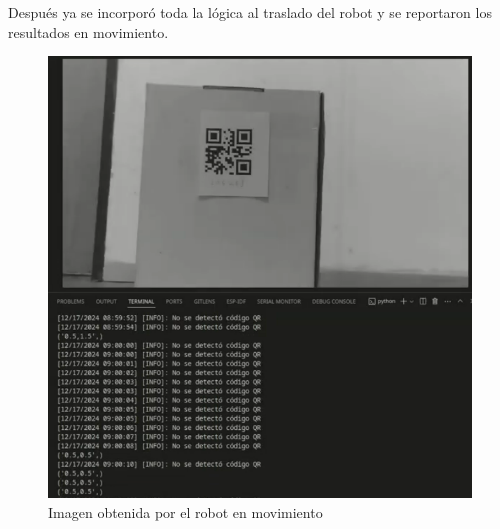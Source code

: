 Después ya se incorporó toda la lógica al traslado del robot y se reportaron los resultados en movimiento.

\begin{figure}[H]
   \centering
   \includegraphics[width=0.7\linewidth]{images/qr.png}
   \caption{Imagen obtenida por el robot en movimiento}
   \label{fig:qr}
\end{figure}